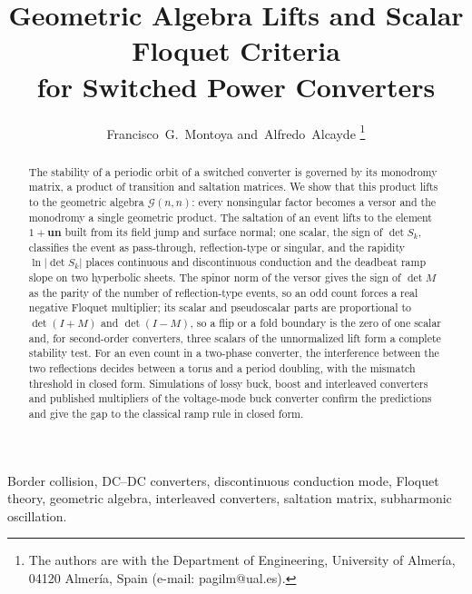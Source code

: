 \documentclass[journal]{IEEEtran}
\newcommand{\Gnn}{\mathcal{G}(n,n)}
\begin{document}
\title{Geometric Algebra Lifts and Scalar Floquet Criteria\\
for Switched Power Converters}

\author{Francisco~G.~Montoya and~Alfredo~Alcayde%
\thanks{The authors are with the Department of Engineering, University of
Almer\'ia, 04120 Almer\'ia, Spain (e-mail: pagilm@ual.es).}}

\maketitle

\begin{abstract}
The stability of a periodic orbit of a switched converter is governed
by its monodromy matrix, a product of transition and saltation
matrices. We show that this product lifts to the geometric algebra
$\Gnn$: every nonsingular factor becomes a versor and the
monodromy a single geometric product. The saltation of an event
lifts to the element $1+\bm{u}\bm{n}$ built from its field jump and
surface normal; one scalar, the sign of $\det S_k$, classifies
the event as pass-through, reflection-type or singular, and the rapidity
$\ln\lvert\det S_k\rvert$ places continuous and discontinuous conduction and
the deadbeat ramp slope on two hyperbolic sheets. The spinor norm of
the versor gives the sign of $\det M$ as the parity of the number of
reflection-type events, so an odd count forces
a real negative Floquet multiplier; its scalar and pseudoscalar parts are
proportional to $\det(I+M)$ and $\det(I-M)$, so a flip or a fold boundary is
the zero of one scalar and, for second-order converters, three scalars of the
unnormalized lift form a complete stability test. For an even count in a
two-phase converter, the interference between the two reflections decides
between a torus and a period doubling, with the mismatch threshold in closed
form. Simulations of lossy buck, boost and interleaved
converters and published multipliers of the voltage-mode buck converter
confirm the predictions and give the gap to the classical ramp rule in closed
form.
\end{abstract}

\begin{IEEEkeywords}
Border collision, DC--DC converters, discontinuous conduction mode, Floquet
theory, geometric algebra, interleaved converters, saltation matrix,
subharmonic oscillation.
\end{IEEEkeywords}
\end{document}
